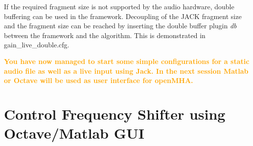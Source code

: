 \documentclass[11pt,a4paper,twoside]{article}
\newcommand{\+}{\discretionary{\mbox{\scriptsize$\hookleftarrow$}}{}{}}
\begin{document}
{{If the required fragment size is not supported by the audio hardware,
double buffering can be used in the \mha{} framework. Decoupling of the JACK
fragment size and the \mha{} fragment size can be reached by inserting the
double buffer plugin \textit{db} between the framework and the
algorithm. This is demonstrated in gain\_live\_double.cfg.

\textcolor{orange}{\textbf{You have now managed to start some simple
    configurations for a static audio file as well as a live input using Jack.
    In the next session Matlab or Octave will be used as user interface for openMHA.}}

\newpage

\section{Control Frequency Shifter using Octave/Matlab GUI}
\label{sec:freqshifter}




}}
\end{document}
